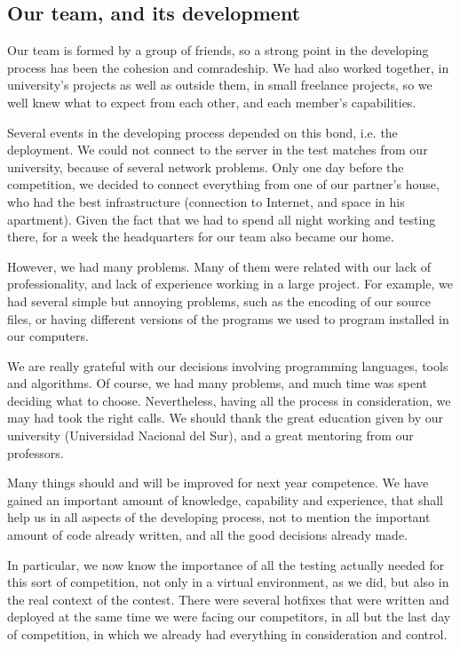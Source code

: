 \documentclass{llncs2e/llncs}
\begin{document}
\subsection{Our team, and its development}

    Our team is formed by a group of friends, so a strong point in the developing 
    process has been the cohesion and comradeship. We had also worked together,
    in university's projects as well as outside them, in small freelance 
    projects, so we well knew what to expect from each other, and each member's 
    capabilities. 

    Several events in the developing process depended on this bond, i.e. the 
    deployment. We could not connect to the server in the test matches from our 
    university, because of several network problems. Only one day before 
    the competition, we decided to connect everything from one of our partner's house, 
    who had the best infrastructure (connection to Internet, and space in his 
    apartment). Given the fact that we had to spend all night working and testing
    there, for a week the headquarters for our team also became our home.

    However, we had many problems. Many of them were related with our lack of 
    professionality, and lack of experience working in a large project. 
    For example, we had several simple but annoying problems, such as the 
    encoding of our source files, or having different versions of the programs 
    we used to program installed in our computers.

    We are really grateful with our decisions involving programming languages, 
    tools and algorithms. Of course, we had many problems, and much time was spent 
    deciding what to choose. Nevertheless, having all the process in 
    consideration, we may had took the right calls. We should thank the great 
    education given by our university (Universidad Nacional del Sur), and a 
    great mentoring from our professors.

    Many things should and will be improved for next year competence. We have
    gained an important amount of knowledge, capability and experience, that shall 
    help us in all aspects of the developing process, not to mention the 
    important amount of code already written, and all the good decisions already 
    made.

    In particular, we now know the importance of all the testing actually needed 
    for this sort of competition, not only in a virtual environment, as we did, 
    but also in the real context of the contest. There were several hotfixes that 
    were written and deployed at the same time we were facing our competitors, in 
    all but the last day of competition, in which we already had everything in 
    consideration and control.
\end{document}
